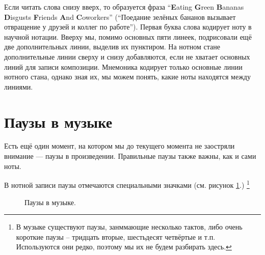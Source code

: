 \documentclass[a4paper,twoside]{book}
\newcounter{example-counter}
\begin{document}
Если читать слова снизу вверх, то образуется фраза ``\textbf{E}ating
\textbf{G}reen \textbf{B}ananas \textbf{D}isgusts \textbf{F}riends \textbf{A}nd
\textbf{C}oworkers'' (``Поедание зелёных бананов вызывает отвращение у друзей и
коллег по работе''). Первая буква слова кодирует ноту в научной нотации. Вверху
мы, помимо основных пяти линеек, подрисовали ещё две дополнительных линии,
выделив их пунктиром. На нотном стане дополнительные линии сверху и снизу
добавляются, если не хватает основных линий для записи композиции. Мнемоника
кодирует только основные линии нотного стана, однако зная их, мы можем понять,
какие ноты находятся между линиями.

\section{Паузы в музыке}

Есть ещё один момент, на котором мы до текущего момента не заостряли внимание ---
паузы в произведении. Правильные паузы также важны, как и сами ноты.

В нотной записи паузы отмечаются специальными значками (см. рисунок
\ref{fig:lilypond-rest-example-1}.) \footnote{В музыке существуют паузы,
занммающие несколько тактов, либо очень короткие паузы -- тридцать вторые,
шестьдесят четвёртые и т.п. Используются они редко, поэтому мы их не будем
разбирать здесь.}

\begin{figure}[ht]
  \caption{Паузы в музыке.}
  \centering
  \label{fig:lilypond-rest-example-1}
\end{figure}
\end{document}
